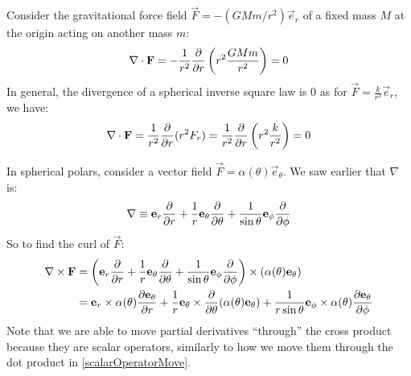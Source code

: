 \documentclass[../main.tex]{subfiles}
\begin{document}
\begin{example}
  Consider the gravitational force field $\vec{F} = - (GMm/r^2)\vec{e}_r$ of a fixed mass $M$ at the origin acting on another mass $m$:
  \[
    \nabla \cdot \vec{F} = - \frac{1}{r^2} \pderiv{}{r}\left(r^2 \frac{GMm}{r^2}\right) = 0
  \]
  In general, the divergence of a spherical inverse square law is 0 as for $\vec{F} = \frac{k}{r^2} \vec{e}_r$, we have:
  \[
    \nabla \cdot \vec{F} = \frac{1}{r^2} \pderiv{}{r}(r^2 F_r) = \frac{1}{r^2} \pderiv{}{r}\left(r^2 \frac{k}{r^2}\right) = 0
  \]
\end{example}
\begin{example}
  In spherical polars, consider a vector field $\vec{F} = \alpha(\theta)\vec{e}_\theta$.
  We saw earlier that $\nabla$ is:
  \[
    \nabla \equiv \vec{e}_r \pderiv{}{r} + \frac{1}{r} \vec{e}_\theta \pderiv{}{\theta} + \frac{1}{\sin \theta}\vec{e}_\phi \pderiv{}{\phi}
  \]
  So to find the curl of $\vec{F}$:
  \begin{align*}
    \nabla \times \vec{F} &= \left(\vec{e}_r \pderiv{}{r} + \frac{1}{r} \vec{e}_\theta \pderiv{}{\theta} + \frac{1}{\sin \theta}\vec{e}_\phi \pderiv{}{\phi}\right) \times (\alpha(\theta) \vec{e}_\theta) \\
                          &= \vec{e}_r \times \alpha(\theta) \pderiv{\vec{e}_\theta}{r} + \frac{1}{r} \vec{e}_\theta \times \pderiv{}{\theta}(\alpha(\theta)\vec{e}_\theta) + \frac{1}{r \sin \theta} \vec{e}_\phi \times \alpha (\theta) \pderiv{\vec{e}_\theta}{\phi}
  \end{align*}
  Note that we are able to move partial derivatives ``through'' the cross product because they are scalar operators, similarly to how we move them through the dot product in \cref{scalarOperatorMove}.


\end{example}
\end{document}
